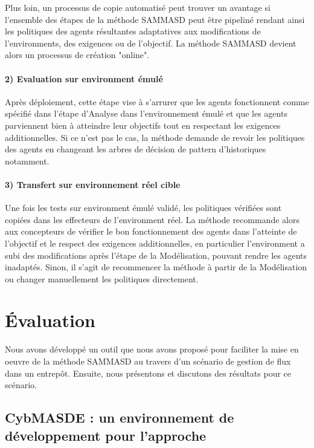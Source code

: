 \documentclass[sigconf,anonymous]{aamas}
\begin{document}
Plus loin, un processus de copie automatisé peut trouver un avantage si l'ensemble des étapes de la méthode SAMMASD peut être pipeliné rendant ainsi les politiques des agents résultantes adaptatives aux modifications de l'environments, des exigences ou de l'objectif. La méthode SAMMASD devient alors un processus de création "online".

\paragraph{\textbf{2) Evaluation sur environment émulé}}

Après déploiement, cette étape vise à s'arrurer que les agents fonctionnent comme spécifié dans l'étape d'Analyse dans l'environnement émulé et que les agents parviennent bien à atteindre leur objectifs tout en respectant les exigences additionnelles. Si ce n'est pas le cas, la méthode demande de revoir les politiques des agents en changeant les arbres de décision de pattern d'historiques notamment.

\paragraph{\textbf{3) Transfert sur environnement réel cible}}

Une fois les tests sur environment émulé validé, les politiques vérifiées sont copiées dans les effecteurs de l'environment réel. La méthode recommande alors aux concepteurs de vérifier le bon fonctionnement des agents dans l'atteinte de l'objectif et le respect des exigences additionnelles, en particulier l'environment a subi des modifications après l'étape de la Modélisation, pouvant rendre les agents inadaptés. Sinon, il s'agit de recommencer la méthode à partir de la Modélisation ou changer manuellement les politiques directement.

\section{Évaluation}
\label{sec:evaluation}

Nous avons développé un outil que nous avons proposé pour faciliter la mise en oeuvre de la méthode SAMMASD au travers d'un scénario de gestion de flux dans un entrepôt. Ensuite, nous présentons et discutons des résultats pour ce scénario.

\subsection{CybMASDE : un environnement de développement pour l'approche}
\end{document}
